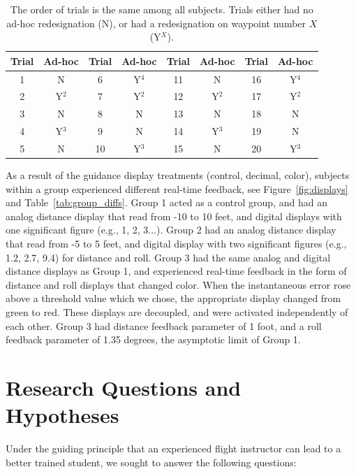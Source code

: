 \documentclass[]{aiaa-tc}%
\begin{document}
\begin{table}[b]
  \begin{center}
    \begin{tabular}{cc|cc|cc|cc}
      \toprule
      Trial & Ad-hoc & Trial & Ad-hoc & Trial & Ad-hoc & Trial & Ad-hoc \\
      \midrule
      1     & N      & 6     & Y$^4$  & 11    & N      & 16    & Y$^4$  \\
      2     & Y$^2$  & 7     & Y$^2$  & 12    & Y$^2$  & 17    & Y$^2$  \\
      3     & N      & 8     & N      & 13    & N      & 18    & N      \\
      4     & Y$^3$  & 9     & N      & 14    & Y$^3$  & 19    & N      \\
      5     & N      & 10    & Y$^3$  & 15    & N      & 20    & Y$^3$  \\
      \bottomrule
    \end{tabular}
  \end{center}
  \caption{The order of trials is the same among all subjects. Trials either had no ad-hoc redesignation (N), or had a redesignation on waypoint number $X$ (Y$^X$).}
  \label{tab:all_trials}
\end{table}

As a result of the guidance display treatments (control, decimal, color), subjects within a group experienced different real-time feedback, see Figure~\ref{fig:displays} and Table~\ref{tab:group_diffs}. Group 1 acted as a control group, and had an analog distance display that read from -10 to 10 feet, and digital displays with one significant figure (e.g., 1, 2, 3...). Group 2 had an analog distance display that read from -5 to 5 feet, and digital display with two significant figures (e.g., 1.2, 2.7, 9.4) for distance and roll. Group 3 had the same analog and digital distance displays as Group 1, and experienced real-time feedback in the form of distance and roll displays that changed color. When the instantaneous error rose above a threshold value which we chose, the appropriate display changed from green to red. These displays are decoupled, and were activated independently of each other. Group 3 had distance feedback parameter of 1 foot, and a roll feedback parameter of 1.35 degrees, the asymptotic limit of Group 1.

\section{Research Questions and Hypotheses}
Under the guiding principle that an experienced flight instructor can lead to a better trained student, we sought to answer the following questions:
\end{document}
